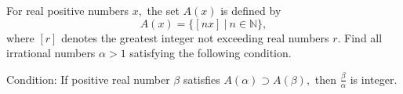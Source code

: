 For real positive numbers $x,$ the set $A(x)$ is defined by\[A(x)=\{[nx]\ | \ n\in{ \mathbb{N}}\},\] where $[r]$ denotes the greatest integer not exceeding real numbers $r$. Find all irrational numbers $\alpha > 1$ satisfying the following condition.

Condition: If  positive real number $\beta$ satisfies $A(\alpha)\supset A(\beta),$ then $\frac{\beta}{\alpha}$ is integer.
